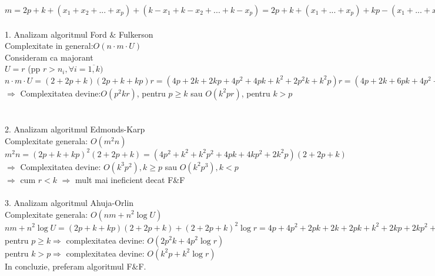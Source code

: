 \documentclass{article}
\begin{document}
$m=2p+k+(x_1+x_2+...+x_p)+(k-x_1+k-x_2+...+k-x_p)=2p+k+(x_1+...+x_p)+kp-(x_1+...+x_p)=2p+k+kp$\\
\bigskip\\
1. Analizam algoritmul Ford $\&$ Fulkerson\\
Complexitate in general:$O(n\cdot m\cdot U)$\\
Consideram ca majorant\\
$U=r$ (pp $r>n_i,\forall i=\overline{1,k})$\\
$n\cdot m\cdot U = (2+2p+k)(2p+k+kp)r=(4p+2k+2kp+4p^2+4pk+k^2+2p^2k+k^2p)r=(4p+2k+6pk+4p^2+k^2+2p^2k+k^2p)r$\\
$\Rightarrow$ Complexitatea devine:$O(p^2kr)$, pentru $p\geq k$ sau $O(k^2pr)$, pentru $k>p$\\
\bigskip\\
\bigskip\\
2. Analizam algoritmul Edmonds-Karp\\
Complexitate generala: $O(m^2n)$\\
$m^2n=(2p+k+kp)^2(2+2p+k)=(4p^2+k^2+k^2p^2+4pk+4kp^2+2k^2p)(2+2p+k)$\\
$\Rightarrow$ Complexitatea devine: $O(k^3p^2), k\geq p$ sau $O(k^2p^3),k<p$\\
$\Rightarrow$ cum $r<k$ $\Rightarrow$ mult mai ineficient decat F\&F \\
\bigskip\\
3. Analizam algoritmul Ahuja-Orlin\\
Complexitate generala: $O(nm+n^2\log U)$\\
$nm+n^2\log U=(2p+k+kp)(2+2p+k)+(2+2p+k)^2\log r = 4p+4p^2+2pk+2k+2pk+k^2+2kp+2kp^2+k^2p+(4+4p^2+k^2+4p+2k+2pk)\log r$\\
pentru $p\geq k$$\Rightarrow$ complexitatea devine: $O(2p^2k+4p^2\log r)$\\
pentru $k>p$$\Rightarrow$ complexitatea devine: $O(k^2p+k^2\log r)$\\
In concluzie, preferam algoritmul F$\&$F.\\
\newpage
\end{document}

